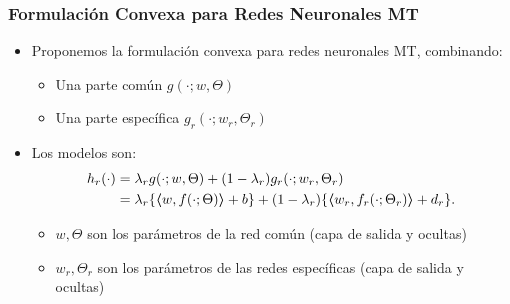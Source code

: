\documentclass{beamer}
\newcommand{\dotp}[2]{\bm{\left\langle} #1, #2 \bm{\right\rangle}}
\begin{document}
\begin{frame}
      \frametitle{Formulación Convexa para Redes Neuronales MT}

      \begin{itemize}
            \item Proponemos la formulación convexa para redes neuronales MT, combinando:
            \begin{itemize}
                  \item Una parte común $g(\cdot; w, \Theta)$
                  \item Una parte específica $g_r(\cdot; w_r, \Theta_r)$
            \end{itemize}
            \item Los modelos son:
            \begin{equation}
                  \nonumber
                  \begin{aligned}
                      h_r(\cdot) &= \lambda_r g(\cdot; w, \Theta) + (1 - \lambda_r) g_r(\cdot; w_r, \Theta_r)
                     \\&= \lambda_r \lbrace \dotp{w}{f(\cdot; \Theta)} + b \rbrace + (1 - \lambda_r) \lbrace \dotp{w_r}{f_r(\cdot; \Theta_r)} + d_r \rbrace.
                  \end{aligned} 
              \end{equation}
              \begin{itemize}
                  \item $w, \Theta$ son los parámetros de la red común (capa de salida y ocultas)
                  \item $w_r, \Theta_r$ son los parámetros de las redes específicas (capa de salida y ocultas)

              \end{itemize}
      \end{itemize}

\end{frame}

\begin{frame}

      

\end{frame}
\end{document}

